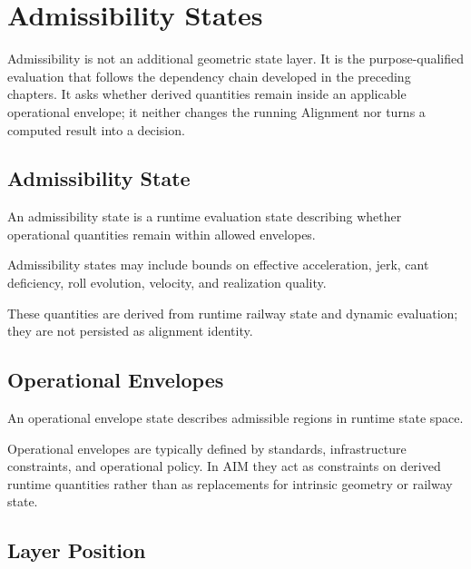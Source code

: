 
\chapter{Admissibility States}

\label{chap:admissibility-states}

Admissibility is not an additional geometric state layer. It is the
purpose-qualified evaluation that follows the dependency chain developed in
the preceding chapters. It asks whether derived quantities remain inside an
applicable operational envelope; it neither changes the running Alignment nor
turns a computed result into a decision.

\section{Admissibility State}

\begin{definition}
\label{def:admissibility-state}
An admissibility state is a runtime evaluation state describing whether
operational quantities remain within allowed envelopes.
\end{definition}

Admissibility states may include bounds on effective acceleration, jerk,
cant deficiency, roll evolution, velocity, and realization quality.

These quantities are derived from runtime railway state and dynamic
evaluation; they are not persisted as alignment identity.

\section{Operational Envelopes}

\begin{definition}
\label{def:operational-envelope-state}
An operational envelope state describes admissible regions in runtime
state space.
\end{definition}

Operational envelopes are typically defined by standards,
infrastructure constraints, and operational policy. In AIM they act as
constraints on derived runtime quantities rather than as replacements
for intrinsic geometry or railway state.

\section{Layer Position}

